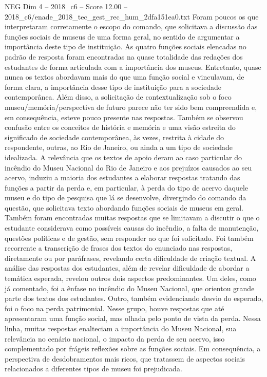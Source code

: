\begin{textsample}{NEG Dim 4 – 2018\_c6 – Score 12.00 – 2018\_c6/enade\_2018\_tec\_gest\_rec\_hum\_2dfa151ea0.txt}
Foram poucos os que interpretaram corretamente o escopo do comando, que solicitava a discussão das funções sociais de museus de uma forma geral, no sentido de argumentar a importância deste tipo de instituição.
As quatro funções sociais elencadas no padrão de resposta foram encontradas na quase totalidade das redações dos estudantes de forma articulada com a importância dos museus.
Entretanto, quase nunca os textos abordavam mais do que uma função social e vinculavam, de forma clara, a importância desse tipo de instituição para a sociedade contemporânea.
Além disso, a solicitação de contextualização sob o foco museu/memória/perspectiva de futuro parece não ter sido bem compreendida e, em consequência, esteve pouco presente nas respostas.
Também se observou confusão entre os conceitos de história e memória e uma visão estreita do significado de sociedade contemporânea, às vezes, restrita à cidade do respondente, outras, ao Rio de Janeiro, ou ainda a um tipo de sociedade idealizada.
A relevância que os textos de apoio deram ao caso particular do incêndio do Museu Nacional do Rio de Janeiro e aos prejuízos causados ao seu acervo, induziu a maioria dos estudantes a elaborar respostas tratando das funções a partir da perda e, em particular, à perda do tipo de acervo daquele museu e do tipo de pesquisa que lá se desenvolve, divergindo do comando da questão, que solicitava texto abordando funções sociais de museus em geral.
Também foram encontradas muitas respostas que se limitavam a discutir o que o estudante considerava como possíveis causas do incêndio, a falta de manutenção, questões políticas e de gestão, sem responder ao que foi solicitado.
Foi também recorrente a transcrição de frases dos textos do enunciado nas respostas, diretamente ou por paráfrases, revelando certa dificuldade de criação textual.
A análise das respostas dos estudantes, além de revelar dificuldade de abordar a temática esperada, revelou outros dois aspectos predominantes.
Um deles, como já comentado, foi a ênfase no incêndio do Museu Nacional, que orientou grande parte dos textos dos estudantes.
Outro, também evidenciando desvio do esperado, foi o foco na perda patrimonial.
Nesse grupo, houve respostas que até apresentaram uma função social, mas olhada pelo ponto de vista da perda.
Nessa linha, muitas respostas enalteciam a importância do Museu Nacional, sua relevância no cenário nacional, o impacto da perda de seu acervo, isso complementado por frágeis reflexões sobre as funções sociais.
Em consequência, a perspectiva de desdobramentos mais ricos, que tratassem de aspectos sociais relacionados a diferentes tipos de museu foi prejudicada.

\end{textsample}

